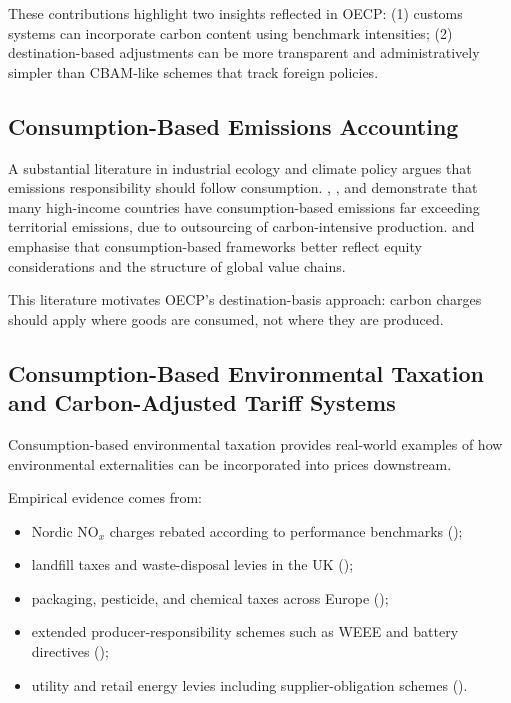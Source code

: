 \documentclass[12pt]{article}
\begin{document}
These contributions highlight two insights reflected in OECP:
(1) customs systems can incorporate carbon content using benchmark intensities;  
(2) destination-based adjustments can be more transparent and administratively 
simpler than CBAM-like schemes that track foreign policies.

\subsection{Consumption-Based Emissions Accounting}

A substantial literature in industrial ecology and climate policy argues that
emissions responsibility should follow consumption.  
\textcite{Peters2008}, \textcite{PetersHertwich2008},  
and \textcite{HertwichPeters2009} demonstrate that many high-income countries have  
consumption-based emissions far exceeding territorial emissions, due to  
outsourcing of carbon-intensive production.  
\textcite{JakobSteckel2014} and \textcite{JakobEdenhofer2014} emphasise that  
consumption-based frameworks better reflect equity considerations  
and the structure of global value chains.

This literature motivates OECP’s destination-basis approach:  
carbon charges should apply where goods are consumed, not where they are produced.

\subsection{Consumption-Based Environmental Taxation and Carbon-Adjusted Tariff Systems}

Consumption-based environmental taxation provides real-world examples of how
environmental externalities can be incorporated into prices downstream.

Empirical evidence comes from:
\begin{itemize}
    \item Nordic NO$_x$ charges rebated according to performance benchmarks  
    (\textcite{BruvollLarsen2004});
    \item landfill taxes and waste-disposal levies in the UK  
    (\textcite{Elliott2011});
    \item packaging, pesticide, and chemical taxes across Europe  
    (\textcite{OECD2016});
    \item extended producer-responsibility schemes such as WEEE and battery directives  
    (\textcite{Tojo2004});
    \item utility and retail energy levies including supplier-obligation schemes  
    (\textcite{Hood2011}).
\end{itemize}
\end{document}
